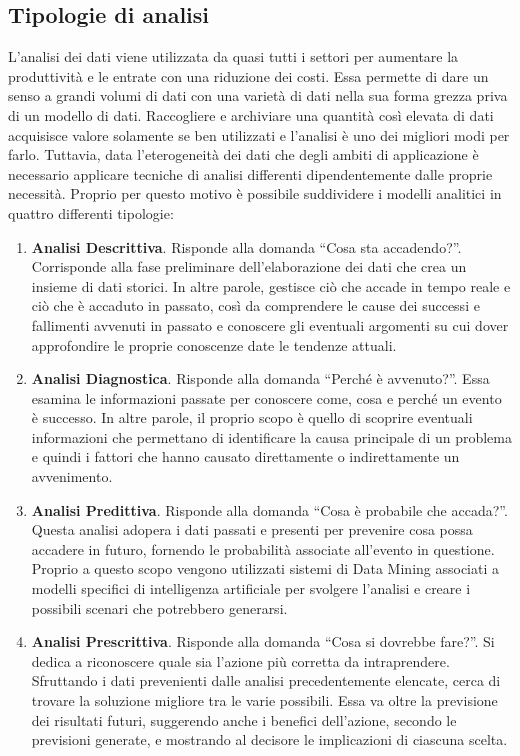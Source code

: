 \subsection{Tipologie di analisi}
L’analisi dei dati viene utilizzata da quasi tutti i settori per aumentare la produttività e le entrate con una riduzione dei costi. Essa permette di dare un senso a grandi volumi di dati con una varietà di dati nella sua forma grezza priva di un modello di dati. Raccogliere e archiviare una quantità così elevata di dati acquisisce valore solamente se ben utilizzati e l'analisi è uno dei migliori modi per farlo.\cite{researchgate_big_data_analytics}
Tuttavia, data l’eterogeneità dei dati che degli ambiti di applicazione è necessario applicare tecniche di analisi differenti dipendentemente dalle proprie necessità. Proprio per questo motivo è possibile suddividere i modelli analitici in quattro differenti tipologie\cite{big_data_analytics_harnessing_data_for_new_business_models}:

\begin{enumerate}
    \item \textbf{Analisi Descrittiva}. Risponde alla domanda “Cosa sta accadendo?”. Corrisponde alla fase preliminare dell'elaborazione dei dati che crea un insieme di dati storici. In altre parole, gestisce ciò che accade in tempo reale e ciò che è accaduto in passato, così da comprendere le cause dei successi e fallimenti avvenuti in passato e conoscere gli eventuali argomenti su cui dover approfondire le proprie conoscenze date le tendenze attuali.
    \item \textbf{Analisi Diagnostica}. Risponde alla domanda “Perché è avvenuto?”. Essa esamina le informazioni passate per conoscere come, cosa e perché un evento è successo. In altre parole, il proprio scopo è quello di scoprire eventuali informazioni che permettano di identificare la causa principale di un problema e quindi i fattori che hanno causato direttamente o indirettamente un avvenimento.
    \item \textbf{Analisi Predittiva}. Risponde alla domanda “Cosa è probabile che accada?”. Questa analisi adopera i dati passati e presenti per prevenire cosa possa accadere in futuro, fornendo le probabilità associate all'evento in questione. Proprio a questo scopo vengono utilizzati sistemi di Data Mining associati a modelli specifici di intelligenza artificiale per svolgere l’analisi e creare i possibili scenari che potrebbero generarsi.
    \item \textbf{Analisi Prescrittiva}. Risponde alla domanda “Cosa si dovrebbe fare?”. Si dedica a riconoscere quale sia l’azione più corretta da intraprendere. Sfruttando i dati prevenienti dalle analisi precedentemente elencate, cerca di trovare la soluzione migliore tra le varie possibili. Essa va oltre la previsione dei risultati futuri, suggerendo anche i benefici dell’azione, secondo le previsioni generate, e mostrando al decisore le implicazioni di ciascuna scelta.
\end{enumerate}

